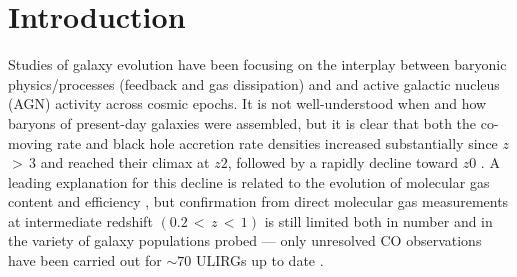\documentclass[]{emulateapj}
\begin{document}

\section{Introduction}
Studies of galaxy evolution have been focusing on the interplay between baryonic physics/processes
(\eg feedback and gas dissipation) and \SF and active galactic nucleus (AGN) activity across cosmic epochs.
It is not well-understood when and how baryons of present-day galaxies were assembled, 
but it is clear that both the co-moving \SF rate and black hole accretion rate densities
increased substantially since $z$\,$>\,3$ and reached their climax at $z$\ssim$2$, followed by 
a rapidly decline toward $z$\ssim$0$ \citep[\eg][]{Hopkins06a, Madau14a}. 
A leading explanation for this decline is related to the evolution of molecular gas content and 
\SF efficiency \citep[]{Erb06a, CW13, Walter14a},
but confirmation from direct molecular gas measurements at intermediate redshift 
$(0.2\,<\,z\,<\,1)$ is still limited both in number and in the variety of galaxy populations probed --- 
only unresolved CO observations have been carried out for $\sim$$70$ ULIRGs up to date \citep{Combes11a, Combes13a}.
\end{document}
